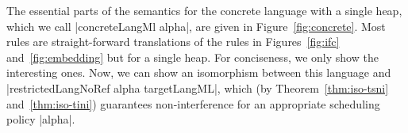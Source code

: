 The essential parts of the semantics for the concrete language
with a single heap,
which we call |concreteLangMl alpha|,
are given in Figure~\ref{fig:concrete}.  Most rules are
straight-forward translations of the rules in Figures~\ref{fig:ifc}
and~\ref{fig:embedding} but for a single heap.  For conciseness, we
only show the interesting ones.
Now, we can show an isomorphism between this language and
|restrictedLangNoRef alpha targetLangML|, which
(by Theorem~\ref{thm:iso-tsni} and~\ref{thm:iso-tini}) guarantees
non-interference for an appropriate scheduling policy |alpha|.




